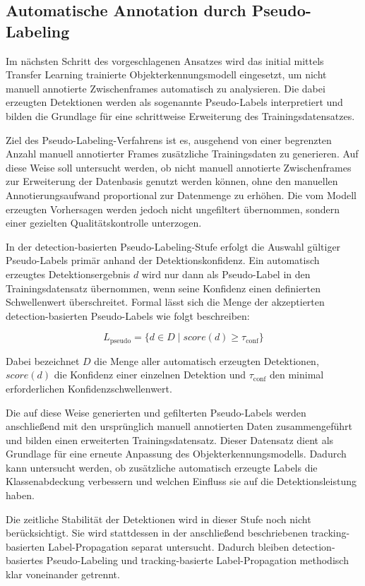 \subsection{Automatische Annotation durch Pseudo-Labeling}

Im nächsten Schritt des vorgeschlagenen Ansatzes wird das initial mittels
Transfer Learning trainierte Objekterkennungsmodell eingesetzt, um nicht manuell
annotierte Zwischenframes automatisch zu analysieren. Die dabei erzeugten
Detektionen werden als sogenannte Pseudo-Labels interpretiert und bilden die
Grundlage für eine schrittweise Erweiterung des Trainingsdatensatzes.

Ziel des Pseudo-Labeling-Verfahrens ist es, ausgehend von einer begrenzten Anzahl
manuell annotierter Frames zusätzliche Trainingsdaten zu generieren. Auf diese
Weise soll untersucht werden, ob nicht manuell annotierte Zwischenframes zur
Erweiterung der Datenbasis genutzt werden können, ohne den manuellen
Annotierungsaufwand proportional zur Datenmenge zu erhöhen. Die vom Modell
erzeugten Vorhersagen werden jedoch nicht ungefiltert übernommen, sondern einer
gezielten Qualitätskontrolle unterzogen.

In der detection-basierten Pseudo-Labeling-Stufe erfolgt die Auswahl gültiger
Pseudo-Labels primär anhand der Detektionskonfidenz. Ein automatisch erzeugtes
Detektionsergebnis \(d\) wird nur dann als Pseudo-Label in den Trainingsdatensatz
übernommen, wenn seine Konfidenz einen definierten Schwellenwert überschreitet.
Formal lässt sich die Menge der akzeptierten detection-basierten Pseudo-Labels
wie folgt beschreiben:

\[
    L_{\text{pseudo}} =
    \{ d \in D \mid score(d) \geq \tau_{\text{conf}} \}
\]

Dabei bezeichnet \(D\) die Menge aller automatisch erzeugten Detektionen,
\(score(d)\) die Konfidenz einer einzelnen Detektion und \(\tau_{\text{conf}}\)
den minimal erforderlichen Konfidenzschwellenwert.

Die auf diese Weise generierten und gefilterten Pseudo-Labels werden anschließend
mit den ursprünglich manuell annotierten Daten zusammengeführt und bilden einen
erweiterten Trainingsdatensatz. Dieser Datensatz dient als Grundlage für eine
erneute Anpassung des Objekterkennungsmodells. Dadurch kann untersucht werden,
ob zusätzliche automatisch erzeugte Labels die Klassenabdeckung verbessern und
welchen Einfluss sie auf die Detektionsleistung haben.

Die zeitliche Stabilität der Detektionen wird in dieser Stufe noch nicht
berücksichtigt. Sie wird stattdessen in der anschließend beschriebenen
tracking-basierten Label-Propagation separat untersucht. Dadurch bleiben
detection-basiertes Pseudo-Labeling und tracking-basierte Label-Propagation
methodisch klar voneinander getrennt.

